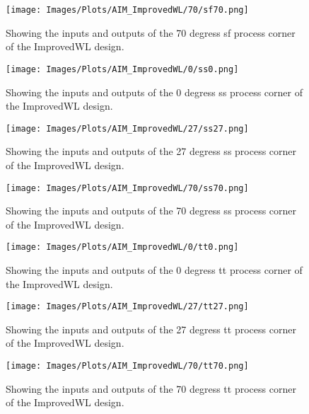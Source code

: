 \newline
\begin{figure}[htb] 
    \centering
    \texttt{[image: Images/Plots/AIM\_ImprovedWL/70/sf70.png]} 
    \caption{Showing the inputs and outputs of the 70 degress sf process corner of the ImprovedWL design.} 
    \label{fig:70sfImprovedWL} 
\end{figure}
\begin{figure}[htb] 
    \centering
    \texttt{[image: Images/Plots/AIM\_ImprovedWL/0/ss0.png]} 
    \caption{Showing the inputs and outputs of the 0 degress ss process corner of the ImprovedWL design.} 
    \label{fig:0ssImprovedWL} 
\end{figure}
\newline
\begin{figure}[htb] 
    \centering
    \texttt{[image: Images/Plots/AIM\_ImprovedWL/27/ss27.png]} 
    \caption{Showing the inputs and outputs of the 27 degress ss process corner of the ImprovedWL design.} 
    \label{fig:27ssImprovedWL} 
\end{figure}
\begin{figure}[htb] 
    \centering
    \texttt{[image: Images/Plots/AIM\_ImprovedWL/70/ss70.png]} 
    \caption{Showing the inputs and outputs of the 70 degress ss process corner of the ImprovedWL design.} 
    \label{fig:70ssImprovedWL} 
\end{figure}
\newline
\begin{figure}[htb] 
    \centering
    \texttt{[image: Images/Plots/AIM\_ImprovedWL/0/tt0.png]} 
    \caption{Showing the inputs and outputs of the 0 degress tt process corner of the ImprovedWL design.} 
    \label{fig:0ttImprovedWL} 
\end{figure}
\begin{figure}[htb] 
    \centering
    \texttt{[image: Images/Plots/AIM\_ImprovedWL/27/tt27.png]} 
    \caption{Showing the inputs and outputs of the 27 degress tt process corner of the ImprovedWL design.} 
    \label{fig:27ttImprovedWL} 
\end{figure}
\newline
\begin{figure}[htb] 
    \centering
    \texttt{[image: Images/Plots/AIM\_ImprovedWL/70/tt70.png]} 
    \caption{Showing the inputs and outputs of the 70 degress tt process corner of the ImprovedWL design.} 
    \label{fig:70ttImprovedWL} 
\end{figure}
